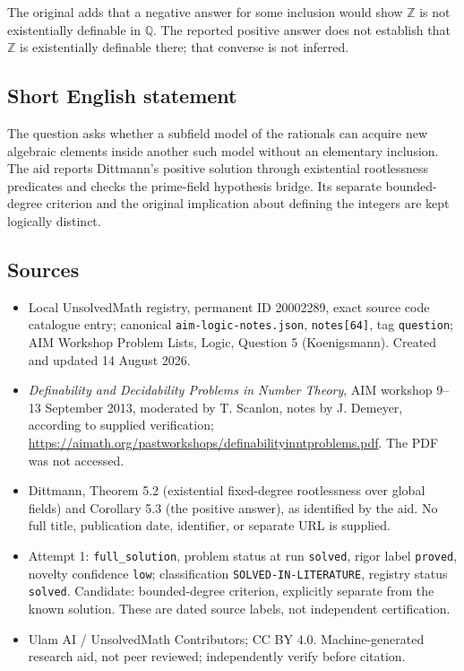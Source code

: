 \documentclass[11pt]{article}
\newcommand{\Z}{\mathbb{Z}}
\newcommand{\Q}{\mathbb{Q}}
\begin{document}
The original adds that a negative answer for some inclusion would show \(\Z\) is not existentially definable in \(\Q\). The reported positive answer does not establish that \(\Z\) is existentially definable there; that converse is not inferred.
\subsection{Short English statement}
The question asks whether a subfield model of the rationals can acquire new algebraic elements inside another such model without an elementary inclusion. The aid reports Dittmann's positive solution through existential rootlessness predicates and checks the prime-field hypothesis bridge. Its separate bounded-degree criterion and the original implication about defining the integers are kept logically distinct.
\subsection{Sources}
\begin{itemize}
\item Local UnsolvedMath registry, permanent ID 20002289, exact source code catalogue entry; canonical \texttt{aim-logic-notes.json}, \texttt{notes[64]}, tag \texttt{question}; AIM Workshop Problem Lists, Logic, Question 5 (Koenigsmann). Created and updated 14 August 2026.
\item \emph{Definability and Decidability Problems in Number Theory}, AIM workshop 9--13 September 2013, moderated by T. Scanlon, notes by J. Demeyer, according to supplied verification; \url{https://aimath.org/pastworkshops/definabilityinntproblems.pdf}. The PDF was not accessed.
\item Dittmann, Theorem 5.2 (existential fixed-degree rootlessness over global fields) and Corollary 5.3 (the positive answer), as identified by the aid. No full title, publication date, identifier, or separate URL is supplied.
\item Attempt 1: \texttt{full\_solution}, problem status at run \texttt{solved}, rigor label \texttt{proved}, novelty confidence \texttt{low}; classification \texttt{SOLVED-IN-LITERATURE}, registry status \texttt{solved}. Candidate: bounded-degree criterion, explicitly separate from the known solution. These are dated source labels, not independent certification.
\item Ulam AI / UnsolvedMath Contributors; CC BY 4.0. Machine-generated research aid, not peer reviewed; independently verify before citation.
\end{itemize}
\end{document}
